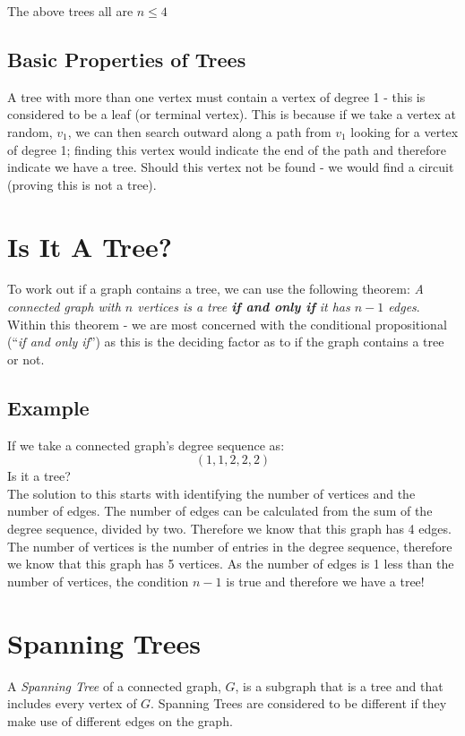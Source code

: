 The above trees all are $n \leq 4$

\subsection{Basic Properties of Trees}
A tree with more than one vertex must contain a vertex of degree 1 - this is considered to be a leaf (or terminal vertex). This is because if we take a vertex at random, $v_1$, we can then search outward along a path from $v_1$ looking for a vertex of degree 1; finding this vertex would indicate the end of the path and therefore indicate we have a tree. Should this vertex not be found - we would find a circuit (proving this is not a tree). 

\section{Is It A Tree?}
To work out if a graph contains a tree, we can use the following theorem: \textit{A connected graph with $n$ vertices is a tree \textbf{if and only if} it has $n-1$ edges}.\\

Within this theorem - we are most concerned with the conditional propositional (``\textit{if and only if}'') as this is the deciding factor as to if the graph contains a tree or not.

\subsection{Example}
If we take a connected graph's degree sequence as:
\[(1, 1, 2, 2, 2)\]
Is it a tree?\\

The solution to this starts with identifying the number of vertices and the number of edges. The number of edges can be calculated from the sum of the degree sequence, divided by two. Therefore we know that this graph has 4 edges. The number of vertices is the number of entries in the degree sequence, therefore we know that this graph has 5 vertices. As the number of edges is 1 less than the number of vertices, the condition $n-1$ is true and therefore we have a tree!

\section{Spanning Trees}
A \textit{Spanning Tree} of a connected graph, $G$, is a subgraph that is a tree and that includes every vertex of $G$. Spanning Trees are considered to be different if they make use of different edges on the graph.

